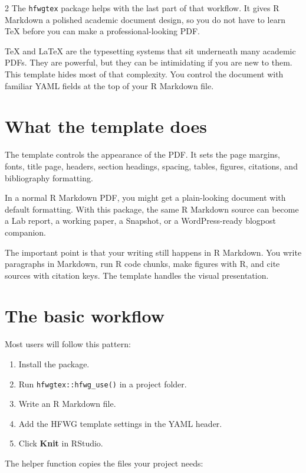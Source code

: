 \documentclass[12pt]{article}
\providecommand{\tightlist}{%
  \setlength{\itemsep}{0pt}%
  \setlength{\parskip}{0pt}%
}
\begin{document}
\begin{multicols}{2}
The \texttt{hfwgtex} package helps with the last part of that workflow.
It gives R Markdown a polished academic document design, so you do not
have to learn TeX before you can make a professional-looking PDF.

TeX and LaTeX are the typesetting systems that sit underneath many
academic PDFs. They are powerful, but they can be intimidating if you
are new to them. This template hides most of that complexity. You
control the document with familiar YAML fields at the top of your R
Markdown file.

\section{What the template does}\label{what-the-template-does}

The template controls the appearance of the PDF. It sets the page
margins, fonts, title page, headers, section headings, spacing, tables,
figures, citations, and bibliography formatting.

In a normal R Markdown PDF, you might get a plain-looking document with
default formatting. With this package, the same R Markdown source can
become a Lab report, a working paper, a Snapshot, or a WordPress-ready
blogpost companion.

The important point is that your writing still happens in R Markdown.
You write paragraphs in Markdown, run R code chunks, make figures with
R, and cite sources with citation keys. The template handles the visual
presentation.

\section{The basic workflow}\label{the-basic-workflow}

Most users will follow this pattern:

\begin{enumerate}
\def\labelenumi{\arabic{enumi}.}
\tightlist
\item
  Install the package.
\item
  Run \texttt{hfwgtex::hfwg\_use()} in a project folder.
\item
  Write an R Markdown file.
\item
  Add the HFWG template settings in the YAML header.
\item
  Click \textbf{Knit} in RStudio.
\end{enumerate}

The helper function copies the files your project needs:


\end{multicols}
\end{document}
